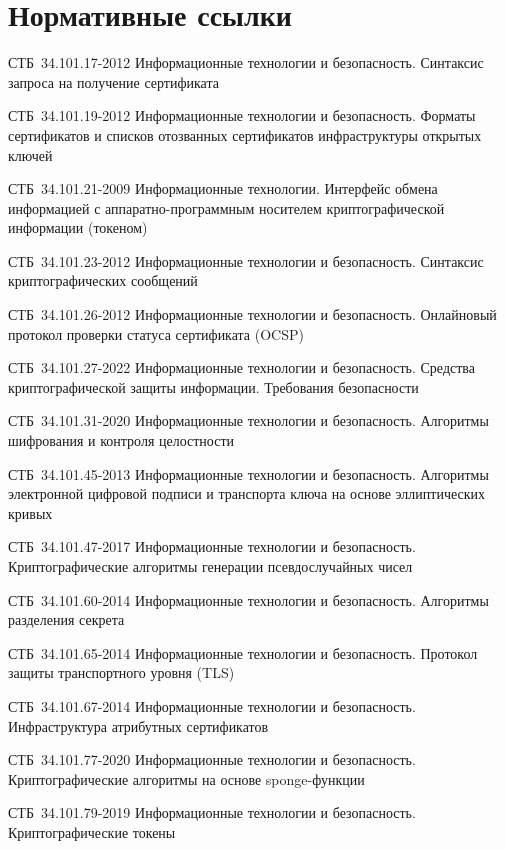 \chapter{Нормативные ссылки}

 
СТБ~34.101.17-2012 Информационные технологии и безопасность. Синтаксис запроса
на получение сертификата

СТБ~34.101.19-2012 Информационные технологии и безопасность. Форматы
сертификатов и списков отозванных сертификатов инфраструктуры открытых ключей

СТБ~34.101.21-2009 Информационные технологии. Интерфейс обмена информацией с
аппаратно-программным носителем криптографической информации (токеном)

СТБ~34.101.23-2012 Информационные технологии и безопасность. Синтаксис
криптографических сообщений

СТБ~34.101.26-2012 Информационные технологии и безопасность. Онлайновый протокол
проверки статуса сертификата (OCSP)

СТБ~34.101.27-2022 Информационные технологии и безопасность. Средства
криптографической защиты информации. Требования безопасности

СТБ~34.101.31-2020 Информационные технологии и безопасность. Алгоритмы 
шифрования и контроля целостности

СТБ~34.101.45-2013 Информационные технологии и безопасность. Алгоритмы 
электронной цифровой подписи и транспорта ключа на основе эллиптических кривых

СТБ~34.101.47-2017 Информационные технологии и безопасность. Криптографические
алгоритмы генерации псевдослучайных чисел

СТБ~34.101.60-2014 Информационные технологии и безопасность. Алгоритмы
разделения секрета

СТБ~34.101.65-2014 Информационные технологии и безопасность. Протокол защиты
транспортного уровня (TLS)

СТБ~34.101.67-2014 Информационные технологии и безопасность. Инфраструктура
атрибутных сертификатов

СТБ~34.101.77-2020 Информационные технологии и безопасность. Криптографические 
алгоритмы на основе sponge-функции

СТБ~34.101.79-2019 Информационные технологии и безопасность. Криптографические
токены

